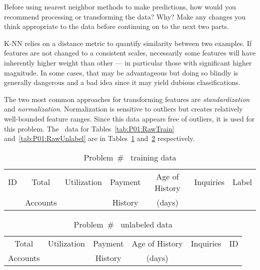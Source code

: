 \begin{subproblem}
  Before using nearest neighbor methods to make predictions, how would you recommend processing or transforming the data? Why? Make any changes you think appropriate to the data before continuing on to the next two parts.
\end{subproblem}

K-NN relies on a distance metric to quantify similarity between two examples.  If features are not changed to a consistent scales, necessarily some features will have inherently higher weight than other --- in particular those with significant higher magnitude.  In some cases, that may be advantageous but doing so blindly is generally dangerous and a bad idea since it may yield dubious classifications.

The two most common approaches for transforming features are \textit{standardization} and \textit{normalization}.  Normalization is sensitive to outliers but creates relatively well-bounded feature ranges.  Since this data appears free of outliers, it is used for this problem. The \featureOp\ data for Tables~\ref{tab:P01:RawTrain} and~\ref{tab:P01:RawUnlabel} are in Tables~\ref{tab:P01:NormalTrain} and~\ref{tab:P01:NormalUnlabel} respectively.

\begin{table}[ht]
  \centering
  \caption{Problem~\# \featureOp\ training data}\label{tab:P01:NormalTrain}
  \begin{tabular}{|c||c|c|c|c|c|c|}
    \hline
    ID & Total    & Utilization & Payment & Age of History & Inquiries & Label \\
       & Accounts &             & History & (days)         &           & \\\hline\hline
    
  \end{tabular}
\end{table}

\begin{table}[ht]
  \centering
  \caption{Problem~\# \featureOp\ unlabeled data}\label{tab:P01:NormalUnlabel}
  \begin{tabular}{|c|c|c|c|c||c|}
    \hline
    Total    & Utilization & Payment & Age of History & Inquiries & ID \\
    Accounts &             & History & (days)         &           & \\\hline\hline
    
  \end{tabular}
\end{table}

